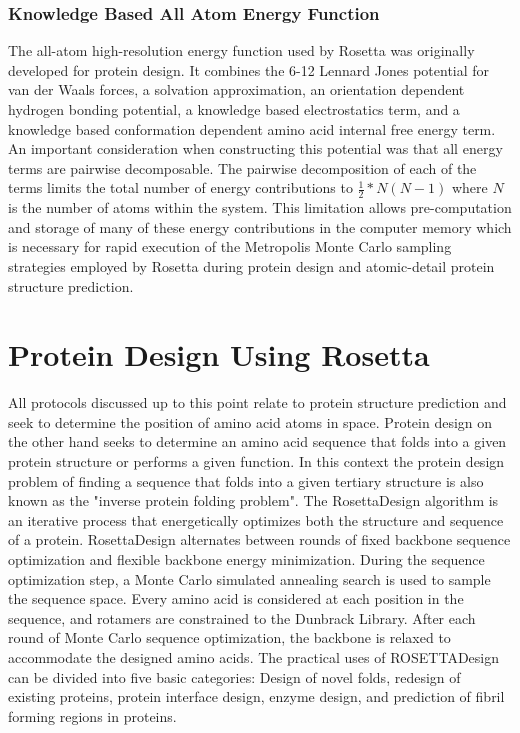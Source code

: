 \subsubsection{Knowledge Based All Atom Energy Function}
The all-atom high-resolution energy function used by Rosetta was originally developed for protein design\citep{Kuhlman:2000tc,Kuhlman:2003kp}.
It combines the 6-12 Lennard Jones potential for van der Waals forces, a solvation approximation\citep{Lazaridis:1999wi}, an orientation dependent hydrogen bonding potential\citep{Kortemme:2003td}, a knowledge based electrostatics term, and a knowledge based conformation dependent amino acid internal free energy term\citep{Dunbrack:1993jt}.
An important consideration when constructing this potential was that all energy terms are pairwise decomposable.
The pairwise decomposition of each of the terms limits the total number of energy contributions to $\frac{1}{2}*N(N-1)$ where $N$ is the number of atoms within the system.
This limitation allows pre-computation and storage of many of these energy contributions in the computer memory which is necessary for rapid execution of the Metropolis Monte Carlo sampling strategies employed by Rosetta during protein design and atomic-detail protein structure prediction.

\section{Protein Design Using Rosetta}
All protocols discussed up to this point relate to protein structure prediction and seek to determine the position of amino acid atoms in space.
Protein design on the other hand seeks to determine an amino acid sequence that folds into a given protein structure or performs a given function.
In this context the protein design problem of finding a sequence that folds into a given tertiary structure is also known as the "inverse protein folding problem".
The RosettaDesign\citep{Kuhlman:2003kp} algorithm is an iterative process that energetically optimizes both the structure and sequence of a protein.
RosettaDesign alternates between rounds of fixed backbone sequence optimization and flexible backbone energy minimization\citep{Kuhlman:2003kp}.
During the sequence optimization step, a Monte Carlo simulated annealing search is used to sample the sequence space.
Every amino acid is considered at each position in the sequence, and rotamers are constrained to the Dunbrack Library\citep{Dunbrack:1993jt}.
After each round of Monte Carlo sequence optimization, the backbone is relaxed to accommodate the designed amino acids\citep{Kuhlman:2003kp}.
The practical uses of ROSETTADesign can be divided into five basic categories: Design of novel folds\citep{Kuhlman:2003kp}, redesign of existing proteins\citep{Korkegian:2005it}, protein interface design, enzyme design\citep{Jiang:2008jk}, and prediction of fibril forming regions in proteins\citep{Thompson:2006cj}.

